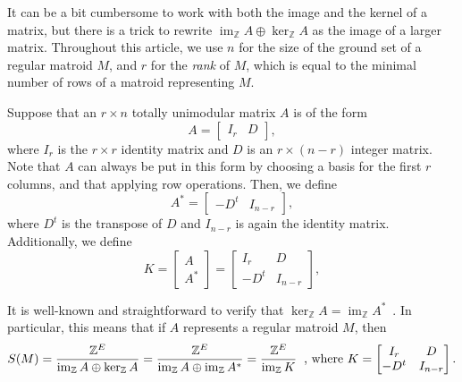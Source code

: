 \documentclass[12p]{amsart}
\numberwithin{equation}{section}
\theoremstyle{plain}
\theoremstyle{definition}
\newcommand{\Z}{\mathbb {Z}}
\DeclareMathOperator{\im}{im}
\begin{document}
It can be a bit cumbersome to work with both the image and the kernel of a matrix, but there is a trick to rewrite $\im_ {\Z} A\oplus \ker_ {\Z} A$ as the image of a larger matrix. Throughout this article, we use $n$ for the size of the ground set of a regular matroid $M$, and $r$ for the \emph{rank} of $M$, which is equal to the minimal number of rows of a matroid representing $M$.

Suppose that an $r \times n$ totally unimodular matrix $A$ is of the form \begin{equation}\label{eq:stand_form} A = \begin{bmatrix} I_r & D\end{bmatrix},\end{equation}
where $I_r$ is the $r\times r$ identity matrix and $D$ is an $r \times (n-r)$ integer matrix. Note that $A$ can always be put in this form by choosing a basis for the first $r$ columns, and that applying row operations. Then, we define \begin{equation}\label{eq:dual_form}A^* = \begin{bmatrix} -D^t & I_{n-r}\end{bmatrix},\end{equation} where $D^t$ is the transpose of $D$ and $I_{n-r}$ is again the identity matrix. Additionally, we define \begin{equation}\label{eq:combo_form}K = \begin{bmatrix} A \\ A^* \end{bmatrix} = \begin{bmatrix}I_r & D \\-D^t & I_{n-r}\end{bmatrix},\end{equation}

It is well-known and straightforward to verify that $\ker_{\Z}  A = \im_{\Z} A^*$~\cite[Corollary 4.6.6]{MCDthesis}. In particular, this means that if $A$ represents a regular matroid $M$, then 
\begin{equation}\label{eq:sandpile_def}S(M) = \frac{\Z^E}{\im_ {\Z} A\oplus \ker_ {\Z} A} = \frac{\Z^E}{\im_ {\Z} A\oplus \im_ {\Z} A^*} = \frac{\Z^E}{\im_{\Z}K}\hspace{.2 cm}\text{, where } K = \begin{bmatrix} I_r & D \\ -D^t & I_{n-r}\end{bmatrix}.\end{equation}
\end{document}
